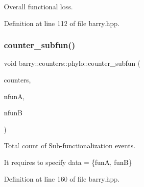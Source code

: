 Overall functional loss. 



Definition at line 112 of file barry.\+hpp.

\mbox{\label{namespacebarry_1_1counters_1_1phylo_a1e4ae98fb2aea199150308431518c4bf}} 
\subsubsection{\texorpdfstring{counter\+\_\+subfun()}{counter\_subfun()}}
{\footnotesize\ttfamily void barry\+::counters\+::phylo\+::counter\+\_\+subfun (\begin{DoxyParamCaption}\item[{\hyperlink{namespacebarry_1_1counters_1_1phylo_a2f117d1cd1dff67e1539cbc0aef5766a}{Phylo\+Counter\+Vector} $\ast$}]{counters,  }\item[{\hyperlink{namespacebarry_a11dfc53ddb4672278319aa04f1e09a6c}{uint}}]{nfunA,  }\item[{\hyperlink{namespacebarry_a11dfc53ddb4672278319aa04f1e09a6c}{uint}}]{nfunB }\end{DoxyParamCaption})\hspace{0.3cm}{\ttfamily [inline]}}



Total count of Sub-\/functionalization events. 

It requires to specify data = \{funA, funB\} 

Definition at line 160 of file barry.\+hpp.

